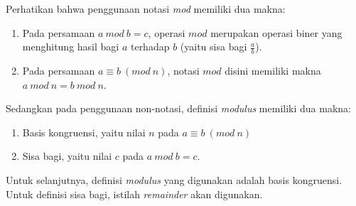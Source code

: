 Perhatikan bahwa penggunaan notasi \textit{mod} memiliki dua makna:
\begin{enumerate}
\item Pada persamaan $a\ mod\ b = c$, operasi $mod$ merupakan operasi biner yang menghitung hasil bagi $a$ terhadap $b$ (yaitu sisa bagi $\frac{a}{b}$).
\item Pada persamaan $a\equiv b\ (mod\ n)$, notasi $mod$ disini memiliki makna $a\ mod\ n=b\ mod\ n$.
\end {enumerate}
Sedangkan pada penggunaan non-notasi, definisi \textit{modulus} memiliki dua makna:
\begin{enumerate}
\item Basis kongruensi, yaitu nilai $n$ pada $a\equiv b\ (mod\ n)$
\item Sisa bagi, yaitu nilai $c$ pada $a\ mod\ b=c$.
\end{enumerate}

Untuk selanjutnya, definisi \textit{modulus} yang digunakan adalah basis kongruensi. Untuk definisi sisa bagi, istilah \textit{remainder} akan digunakan.

